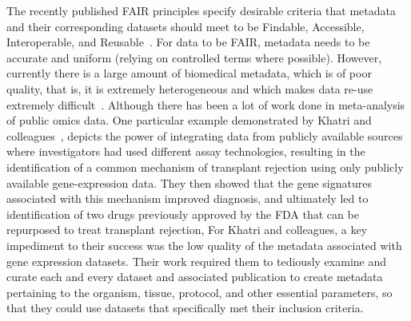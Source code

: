 The recently published FAIR principles specify desirable criteria that metadata and their corresponding datasets should meet to be Findable, Accessible, Interoperable, and Reusable~\cite{Wilkinson2016}.
For data to be FAIR, metadata needs to be accurate and uniform (relying on controlled terms where possible). However, currently there is a large amount of biomedical metadata, which is of poor quality, that is, it is extremely heterogeneous and which makes data re-use extremely difficult~\cite{gonccalves2017metadata}. 
Although there has been a lot of work done in meta-analysis of public omics data. One particular example demonstrated by Khatri and colleagues~\cite{khatri2013common}, depicts the power of integrating data from publicly available sources where investigators had used different assay technologies, resulting in the identification of a common mechanism of transplant rejection using only publicly available gene-expression data. 
They then showed that the gene signatures associated with this mechanism improved diagnosis, and ultimately led to identification of two drugs previously approved by the FDA that can be repurposed to treat transplant rejection,
For Khatri and colleagues, a key impediment to their success was the low quality of the metadata associated with gene expression datasets. Their work required them to tediously examine and curate each and every dataset and associated publication to create metadata pertaining to the organism, tissue, protocol, and other essential parameters, so that they could use datasets that specifically met their inclusion criteria.

